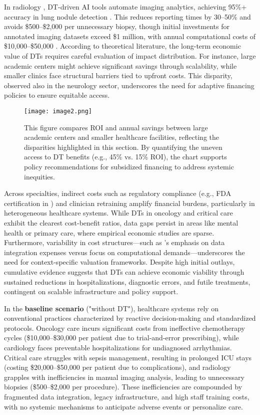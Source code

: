 \documentclass[10pt,a4paper]{article}
\begin{document}
In radiology , DT-driven AI tools automate imaging analytics, achieving 95\%+ accuracy in lung nodule detection \cite{Bocean2025}. This reduces reporting times by 30–50\% and avoids \$500–\$2,000 per unnecessary biopsy, though initial investments for annotated imaging datasets exceed \$1 million, with annual computational costs of \$10,000–\$50,000 \cite{Bocean2025}. According to theoretical literature, the long-term economic value of DTs requires careful evaluation of impact distribution. For instance, large academic centers might achieve significant savings through scalability, while smaller clinics face structural barriers tied to upfront costs. This disparity, observed also in the neurology sector, underscores the need for adaptive financing policies to ensure equitable access.

\begin{figure} [H]
    \centering
    \texttt{[image: image2.png]}
    \caption{This figure compares ROI and annual savings between large academic centers and smaller healthcare facilities, reflecting the disparities highlighted in this section. By quantifying the uneven access to DT benefits (e.g., 45\% vs. 15\% ROI), the chart supports policy recommendations for subsidized financing to address systemic inequities.}
    \label{fig:plot3}
\end{figure}

Across specialties, indirect costs such as regulatory compliance (e.g., FDA certification in \cite{Wang2025}) and clinician retraining amplify financial burdens, particularly in heterogeneous healthcare systems. While DTs in oncology and critical care exhibit the clearest cost-benefit ratios, data gaps persist in areas like mental health or primary care, where empirical economic studies are sparse. Furthermore, variability in cost structures—such as \cite{Ahmed2023}’s emphasis on data integration expenses versus \cite{Bocean2025} focus on computational demands—underscores the need for context-specific valuation frameworks. Despite high initial outlays, cumulative evidence suggests that DTs can achieve economic viability through sustained reductions in hospitalizations, diagnostic errors, and futile treatments, contingent on scalable infrastructure and policy support.

In the \textbf{baseline scenario} ("without DT"), healthcare systems rely on conventional practices characterized by reactive decision-making and standardized protocols. Oncology care incurs significant costs from ineffective chemotherapy cycles (\$10,000–\$30,000 per patient due to trial-and-error prescribing), while cardiology faces preventable hospitalizations for undiagnosed arrhythmias. Critical care struggles with sepsis management, resulting in prolonged ICU stays (costing \$20,000–\$50,000 per patient due to complications), and radiology grapples with inefficiencies in manual imaging analysis, leading to unnecessary biopsies (\$500–\$2,000 per procedure). These inefficiencies are compounded by fragmented data integration, legacy infrastructure, and high staff training costs, with no systemic mechanisms to anticipate adverse events or personalize care.  
\end{document}
